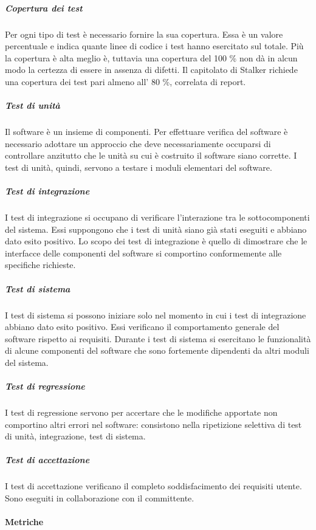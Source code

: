 \documentclass[../norme-di-progetto.tex]{subfiles}
\begin{document}
\subparagraph{Copertura dei test}%
\label{subp:copertura_dei_test}
Per ogni tipo di test è necessario fornire la sua copertura.
Essa è un valore percentuale e indica quante linee di codice i test hanno esercitato sul totale.
Più la copertura è alta meglio è, tuttavia una copertura del 100 \% non dà in alcun modo la certezza di essere in assenza di difetti.
Il capitolato di Stalker richiede una copertura dei test pari almeno all' 80 \%, correlata di report.

\subparagraph{Test di unità}%
\label{subp:test_di_unita}
Il software è un insieme di componenti. Per effettuare verifica del software è necessario adottare un approccio  che deve necessariamente occuparsi di controllare anzitutto che le unità su cui è costruito il software siano corrette. I test di unità, quindi, servono a testare i moduli elementari del software.

\subparagraph{Test di integrazione}%
\label{subp:test_di_integrazione}
I test di integrazione si occupano di verificare l'interazione tra le sottocomponenti del sistema. Essi suppongono che i test di unità siano già stati eseguiti e abbiano dato esito positivo. Lo scopo dei test di integrazione è quello di dimostrare che le interfacce delle componenti del software si comportino conformemente alle specifiche richieste.

\subparagraph{Test di sistema}%
\label{test_di_sistema}
I test di sistema si possono iniziare solo nel momento in cui i test di integrazione abbiano dato esito positivo. Essi verificano il comportamento generale del software rispetto ai requisiti. Durante i test di sistema si esercitano le funzionalità di alcune componenti del software che sono fortemente dipendenti da altri moduli del sistema.

\subparagraph{Test di regressione}%
\label{test_di_regressione}
I test di regressione servono per accertare che le modifiche apportate non comportino altri errori nel software: consistono nella ripetizione selettiva di test di unità, integrazione, test di sistema.

\subparagraph{Test di accettazione}%
\label{test_di_accettazione}
I test di accettazione verificano il completo soddisfacimento dei requisiti utente. Sono eseguiti in collaborazione con il committente.

\paragraph{Metriche}%
\label{par:metriche}
\end{document}
